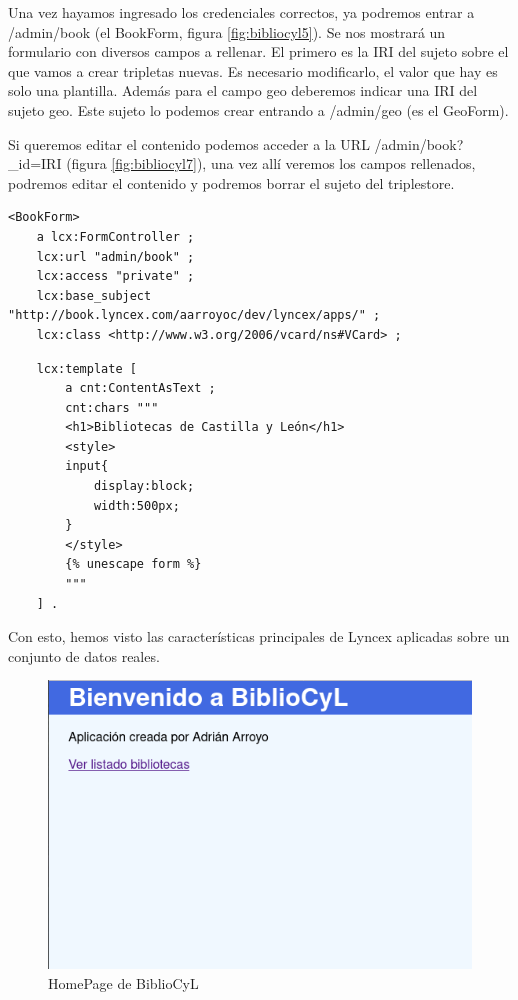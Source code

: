 \documentclass[openright,twoside,12pt]{book}
\begin{document}
Una vez hayamos ingresado los credenciales correctos, ya podremos entrar a /admin/book (el BookForm, figura \ref{fig:bibliocyl5}). Se nos mostrará un formulario con diversos campos a rellenar. El primero es la IRI del sujeto sobre el que vamos a crear tripletas nuevas. Es necesario modificarlo, el valor que hay es solo una plantilla. Además para el campo geo deberemos indicar una IRI del sujeto geo. Este sujeto lo podemos crear entrando a /admin/geo (es el GeoForm).

Si queremos editar el contenido podemos acceder a la URL /admin/book?\_id=IRI (figura \ref{fig:bibliocyl7}), una vez allí veremos los campos rellenados, podremos editar el contenido y podremos borrar el sujeto del triplestore.

\begin{lstlisting}
<BookForm>
    a lcx:FormController ;
    lcx:url "admin/book" ;
    lcx:access "private" ;
    lcx:base_subject "http://book.lyncex.com/aarroyoc/dev/lyncex/apps/" ;
    lcx:class <http://www.w3.org/2006/vcard/ns#VCard> ;
\end{lstlisting}
\begin{lstlisting}
    lcx:template [
        a cnt:ContentAsText ;
        cnt:chars """
        <h1>Bibliotecas de Castilla y León</h1>
        <style>
        input{
            display:block;
            width:500px;
        }
        </style>
        {% unescape form %}
        """
    ] .
\end{lstlisting}

Con esto, hemos visto las características principales de Lyncex aplicadas sobre un conjunto de datos reales.

\begin{figure}
    \centering
    \includegraphics[width=\textwidth]{tour/bibliocyl1.png}
    \caption{HomePage de BiblioCyL}
    \label{fig:bibliocyl1}
\end{figure}
\end{document}

